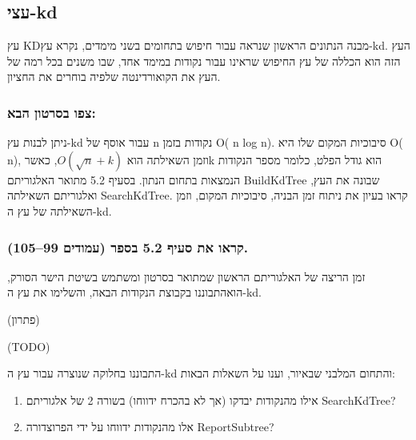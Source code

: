 \documentclass[
]{book}
\providecommand{\tightlist}{%
  \setlength{\itemsep}{0pt}\setlength{\parskip}{0pt}}
\begin{document}
\hypertarget{kd-trees}{%
\subsection{עצי-kd}\label{kd-trees}}

עץ KDמבנה הנתונים הראשון שנראה עבור חיפוש בתחומים בשני מימדים, נקרא עץ-kd. העץ הזה הוא הכללה של עץ החיפוש שראינו עבור נקודות במימד אחד, שבו משנים בכל רמה של העץ את הקואורדינטה שלפיה בוחרים את החציון.

\hypertarget{ux5e6ux5e4ux5d5-ux5d1ux5e1ux5e8ux5d8ux5d5ux5df-ux5d4ux5d1ux5d0-5}{%
\subsubsection*{צפו בסרטון הבא:}\label{ux5e6ux5e4ux5d5-ux5d1ux5e1ux5e8ux5d8ux5d5ux5df-ux5d4ux5d1ux5d0-5}}

ניתן לבנות עץ-kd עבור אוסף של n נקודות בזמן O( n log n). סיבוכיות המקום שלו היא O( n), וזמן השאילתה הוא \(O(\sqrt{n}+ k)\), כאשרk הוא גודל הפלט, כלומר מספר הנקודות הנמצאות בתחום הנתון. בסעיף 5.2 מתואר האלגוריתם BuildKdTree שבונה את העץ, ואלגוריתם השאילתה SearchKdTree. קראו בעיון את ניתוח זמן הבניה, סיבוכיות המקום, וזמן השאילתה של עץ ה-kd.

\hypertarget{ux5e7ux5e8ux5d0ux5d5-ux5d0ux5ea-ux5e1ux5e2ux5d9ux5e3-5.2-ux5d1ux5e1ux5e4ux5e8-ux5e2ux5deux5d5ux5d3ux5d9ux5dd-99105.}{%
\subsubsection*{קראו את סעיף 5.2 בספר (עמודים 99--105).}\label{ux5e7ux5e8ux5d0ux5d5-ux5d0ux5ea-ux5e1ux5e2ux5d9ux5e3-5.2-ux5d1ux5e1ux5e4ux5e8-ux5e2ux5deux5d5ux5d3ux5d9ux5dd-99105.}}

זמן הריצה של האלגוריתם הראשון שמתואר בסרטון ומשתמש בשיטת הישר הסורק, הואהתבוננו בקבוצת הנקודות הבאה, והשלימו את עץ ה-kd.

(פתרון)

(TODO)

התבוננו בחלוקה שנוצרה עבור עץ ה-kd והתחום המלבני שבאיור, וענו על השאלות הבאות:

\begin{enumerate}
\def\labelenumi{\arabic{enumi}.}
\tightlist
\item
  אילו מהנקודות יבדקו (אך לא בהכרח ידווחו) בשורה 2 של אלגוריתם SearchKdTree?
\item
  אלו מהנקודות ידווחו על ידי הפרוצדורה ReportSubtree?
\end{enumerate}
\end{document}
